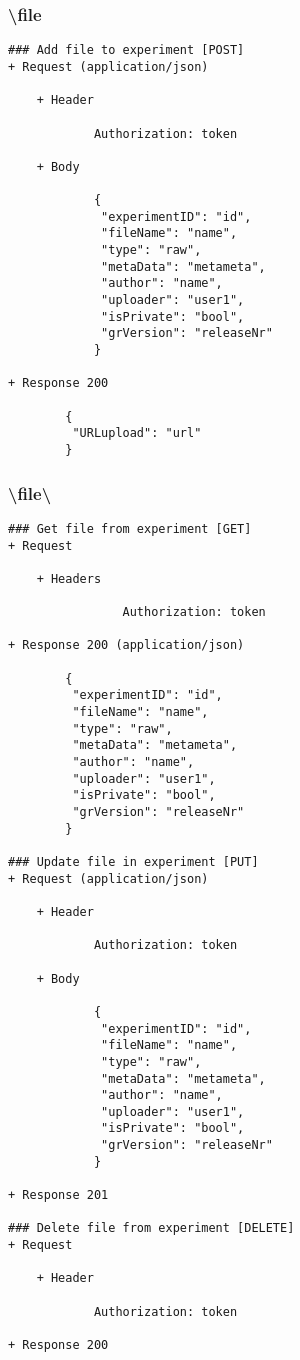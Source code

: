 \subsubsection*{\textbackslash file}
\begin{verbatim}
### Add file to experiment [POST]
+ Request (application/json)

    + Header
    
            Authorization: token
    
    + Body
    
            { 
             "experimentID": "id",
             "fileName": "name",
             "type": "raw",
             "metaData": "metameta",
             "author": "name",
             "uploader": "user1",
             "isPrivate": "bool",
             "grVersion": "releaseNr"
            }

+ Response 200

        {
         "URLupload": "url"
        }

\end{verbatim}
\subsubsection*{\textbackslash file\textbackslash <file-id>}
\begin{verbatim}
### Get file from experiment [GET]
+ Request 

    + Headers
    
                Authorization: token
                
+ Response 200 (application/json)

        { 
         "experimentID": "id",
         "fileName": "name",
         "type": "raw",
         "metaData": "metameta",
         "author": "name",
         "uploader": "user1",
         "isPrivate": "bool",
         "grVersion": "releaseNr"
        }

### Update file in experiment [PUT]
+ Request (application/json)

    + Header
    
            Authorization: token
    
    + Body
        
            { 
             "experimentID": "id",
             "fileName": "name",
             "type": "raw",
             "metaData": "metameta",
             "author": "name",
             "uploader": "user1",
             "isPrivate": "bool",
             "grVersion": "releaseNr"
            }
            
+ Response 201

### Delete file from experiment [DELETE]
+ Request

    + Header
    
            Authorization: token
        
+ Response 200
\end{verbatim}
